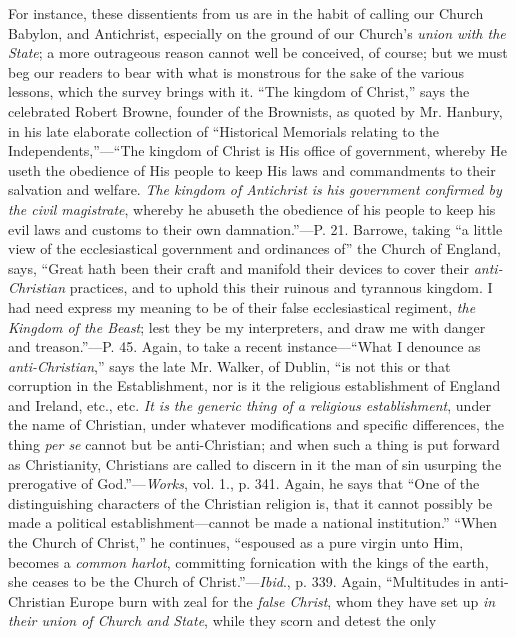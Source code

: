 For instance, these dissentients from us are in the habit of
calling our Church Babylon, and Antichrist, especially on the ground
of our Church's \emph{union with the State}; a more outrageous reason
cannot well be conceived, of course; but we must beg our readers to
bear with what is monstrous for the sake of the various lessons, which
the survey brings with it. ``The kingdom of Christ,'' says the
celebrated Robert Browne, founder of the Brownists, as quoted by Mr.
Hanbury, in his late elaborate collection of ``Historical
Memorials relating to the Independents,''—``The kingdom of
Christ is His office of government, whereby He useth the obedience of
His people to keep His laws and commandments to their salvation and
welfare. \emph{The kingdom of Antichrist} \emph{is his government
confirmed by the civil magistrate}, whereby he abuseth the
obedience of his people to keep his evil laws and customs to their own
damnation.''—P. 21. Barrowe, taking ``a little view of the
ecclesiastical government and ordinances of'' the Church of
England, says, ``Great hath been their craft and manifold their
devices to cover their \emph{anti-Christian} practices, and to uphold
this their ruinous and tyrannous kingdom. I had need express my
meaning to be of their false ecclesiastical regiment, \emph{the Kingdom
of the Beast}; lest they be my interpreters, and draw me with
danger and treason.''—P. 45. Again, to take a recent instance—``What
I denounce as \emph{anti-Christian},'' says the late Mr. Walker,
of Dublin, ``is not this or that corruption in the Establishment,
nor is it the religious establishment of England and Ireland, etc.,
etc. \emph{It is the generic thing of a religious establishment},
under the name of Christian, under whatever modifications and specific
differences, the thing \emph{per se} cannot but be anti-Christian; and
when such a thing is put forward as Christianity, Christians are
called to discern in it the man of sin usurping the prerogative of
God.''—\emph{Works}, vol. 1., p. 341. Again, he says that
``One of the distinguishing characters of the Christian religion
is, that it cannot possibly be made a political establishment—cannot
be made a national institution.'' ``When the Church of
Christ,'' he continues, ``espoused as a pure virgin unto Him,
becomes a \emph{common harlot}, committing fornication with the kings
of the earth, she ceases to be the Church of Christ.''—\emph{Ibid}.,
p. 339. Again, ``Multitudes in anti-Christian Europe burn with
zeal for the \emph{false Christ}, whom they have set up \emph{in their
union of Church and State}, while they scorn and detest the only
